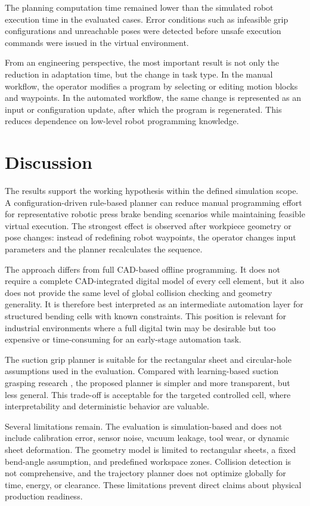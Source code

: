 \documentclass[journal]{IEEEtran}
\begin{document}
The planning computation time remained lower than the simulated robot execution time in the evaluated cases. Error conditions such as infeasible grip configurations and unreachable poses were detected before unsafe execution commands were issued in the virtual environment.

From an engineering perspective, the most important result is not only the reduction in adaptation time, but the change in task type. In the manual workflow, the operator modifies a program by selecting or editing motion blocks and waypoints. In the automated workflow, the same change is represented as an input or configuration update, after which the program is regenerated. This reduces dependence on low-level robot programming knowledge.

\section{Discussion}
The results support the working hypothesis within the defined simulation scope. A configuration-driven rule-based planner can reduce manual programming effort for representative robotic press brake bending scenarios while maintaining feasible virtual execution. The strongest effect is observed after workpiece geometry or pose changes: instead of redefining robot waypoints, the operator changes input parameters and the planner recalculates the sequence.

The approach differs from full CAD-based offline programming. It does not require a complete CAD-integrated digital model of every cell element, but it also does not provide the same level of global collision checking and geometry generality. It is therefore best interpreted as an intermediate automation layer for structured bending cells with known constraints. This position is relevant for industrial environments where a full digital twin may be desirable but too expensive or time-consuming for an early-stage automation task.

The suction grip planner is suitable for the rectangular sheet and circular-hole assumptions used in the evaluation. Compared with learning-based suction grasping research \cite{Mahler2018DexNet3}, the proposed planner is simpler and more transparent, but less general. This trade-off is acceptable for the targeted controlled cell, where interpretability and deterministic behavior are valuable.

Several limitations remain. The evaluation is simulation-based and does not include calibration error, sensor noise, vacuum leakage, tool wear, or dynamic sheet deformation. The geometry model is limited to rectangular sheets, a fixed bend-angle assumption, and predefined workspace zones. Collision detection is not comprehensive, and the trajectory planner does not optimize globally for time, energy, or clearance. These limitations prevent direct claims about physical production readiness.
\end{document}
